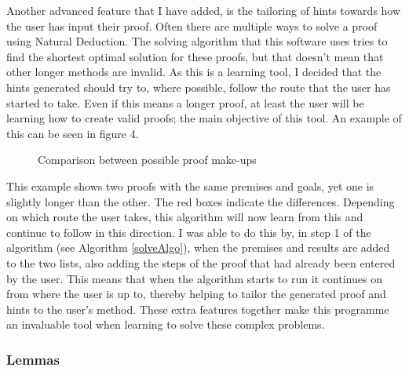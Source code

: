 Another advanced feature that I have added, is the tailoring of hints towards how the user has input their proof. Often there are multiple ways to solve a proof using Natural Deduction. The solving algorithm that this software uses tries to find the shortest optimal solution for these proofs, but that doesn't mean that other longer methods are invalid. As this is a learning tool, I decided that the hints generated should try to, where possible, follow the route that the user has started to take. Even if this means a longer proof, at least the user will be learning how to create valid proofs; the main objective of this tool. An example of this can be seen in figure 4.

\begin{figure}[!ht]
	\centering
	\caption{Comparison between possible proof make-ups}
\end{figure}

This example shows two proofs with the same premises and goals, yet one is slightly longer than the other. The red boxes indicate the differences. Depending on which route the user takes, this algorithm will now learn from this and continue to follow in this direction. I was able to do this by, in step 1 of the algorithm (see Algorithm \ref{solveAlgo}), when the premises and results are added to the two lists, also adding the steps of the proof that had already been entered by the user. This means that when the algorithm starts to run it continues on from where the user is up to, thereby helping to tailor the generated proof and hints to the user's method. These extra features together make this programme an invaluable tool when learning to solve these complex problems. 

\subsubsection{Lemmas \label{lemmas}}

